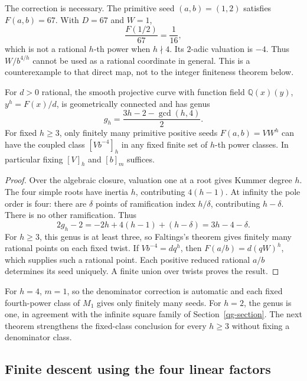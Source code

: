 The correction is necessary. The primitive seed $(a,b)=(1,2)$ satisfies
$F(a,b)=67$. With $D=67$ and $W=1$,
\[
 \frac{F(1/2)}{67}=\frac1{16},
\]
which is not a rational $h$-th power when $h\nmid4$. Its $2$-adic
valuation is $-4$. Thus $W/b^{4/h}$ cannot be used as a rational
coordinate in general. This is a counterexample to that direct map,
not to the integer finiteness theorem below.

\begin{theorem}\label{pl-direct-genus}
For $d>0$ rational, the smooth projective curve with function field
$\mathbb Q(x)(y)$, $y^h=F(x)/d$, is geometrically connected and has genus
\begin{equation}\label{pl-direct-genus-formula}
 g_h=\frac{3h-2-\gcd(h,4)}2.
\end{equation}
For fixed $h\ge3$, only finitely many primitive positive seeds
$F(a,b)=VW^h$ can have the coupled class
$[Vb^{-4}]_h$ in any fixed finite set of $h$-th power classes.
In particular fixing $[V]_h$ and $[b]_m$ suffices.
\end{theorem}
\begin{proof}
Over the algebraic closure, valuation one at a root gives Kummer degree
$h$. The four simple roots have inertia $h$, contributing $4(h-1)$.
At infinity the pole order is four: there are $\delta$ points of
ramification index $h/\delta$, contributing $h-\delta$. There is no
other ramification. Thus
\[
 2g_h-2=-2h+4(h-1)+(h-\delta)=3h-4-\delta.
\]
For $h\ge3$, this genus is at least three, so Faltings's theorem gives
finitely many rational points on each fixed twist. If
$Vb^{-4}=dq^h$, then $F(a/b)=d(qW)^h$, which supplies such a rational
point. Each positive reduced rational $a/b$ determines its seed uniquely.
A finite union over twists proves the result.
\end{proof}

For $h=4$, $m=1$, so the denominator correction is automatic and each
fixed fourth-power class of $M_1$ gives only finitely many seeds. For
$h=2$, the genus is one, in agreement with the infinite square family
of Section~\ref{qg-section}. The next theorem strengthens the
fixed-class conclusion for every $h\ge3$ without fixing a denominator
class.

\subsection{Finite descent using the four linear factors}

